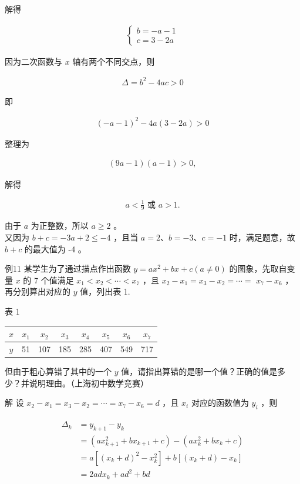\documentclass[10pt]{article}
\begin{document}
解得

\begin{align*}
\left\{\begin{array}{l}
b=-a-1 \\
c=3-2 a
\end{array}\right.
\end{align*}

因为二次函数与 $x$ 轴有两个不同交点，则

\begin{align*}
\Delta=b^{2}-4 a c>0
\end{align*}

即

\begin{align*}
(-a-1)^{2}-4 a(3-2 a)>0
\end{align*}

整理为

\begin{align*}
(9 a-1)(a-1)>0,
\end{align*}

解得

\begin{align*}
a<\frac{1}{9} \text { 或 } a>1 .
\end{align*}

由于 $a$ 为正整数，所以 $a \geqslant 2$ 。\\
又因为 $b+c=-3 a+2 \leqslant-4$ ，且当 $a=2 、 b=-3 、 c=-1$ 时，满足题意，故 $b+c$ 的最大值为 -4 。

例11 某学生为了通过描点作出函数 $y=a x^{2}+b x+c(a \neq 0)$ 的图象，先取自变量 $x$ 的 7 个值满足 $x_{1}<x_{2}<\cdots<x_{7}$ ，且 $x_{2}-x_{1}=x_{3}-x_{2}=\cdots=$ $x_{7}-x_{6}$ ，再分别算出对应的 $y$ 值，列出表 1.

表 1

\begin{center}
\begin{tabular}{c|c|c|c|c|c|c|c}
\hline
$x$ & $x_{1}$ & $x_{2}$ & $x_{3}$ & $x_{4}$ & $x_{5}$ & $x_{6}$ & $x_{7}$ \\
\hline
$y$ & 51 & 107 & 185 & 285 & 407 & 549 & 717 \\
\hline
\end{tabular}
\end{center}

但由于粗心算错了其中的一个 $y$ 值，请指出算错的是哪一个值？正确的值是多少？并说明理由。（上海初中数学竞赛）

解 设 $x_{2}-x_{1}=x_{3}-x_{2}=\cdots=x_{7}-x_{6}=d$ ，且 $x_{i}$ 对应的函数值为 $y_{i}$ ，则

\begin{align*}
\begin{aligned}
\Delta_{k} & =y_{k+1}-y_{k} \\
& =\left(a x_{k+1}^{2}+b x_{k+1}+c\right)-\left(a x_{k}^{2}+b x_{k}+c\right) \\
& =a\left[\left(x_{k}+d\right)^{2}-x_{k}^{2}\right]+b\left[\left(x_{k}+d\right)-x_{k}\right] \\
& =2 a d x_{k}+a d^{2}+b d
\end{aligned}
\end{align*}
\end{document}
